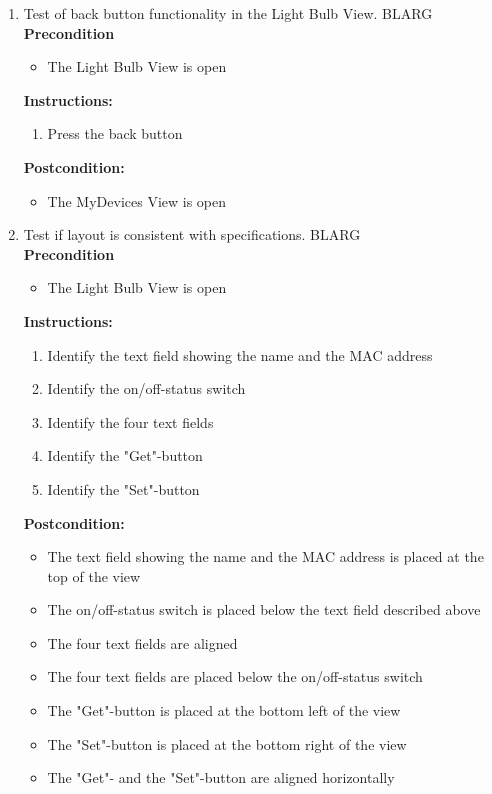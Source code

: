\documentclass[a4paper]{article}
\newlength{\testlabellength}
\newenvironment{testlist}{\begin{enumerate}[label=\bfseries Instruction \thesubsection.\arabic* , labelindent=0pt, labelwidth=\testlabellength , leftmargin=2cm]}{\end{enumerate}}
\newenvironment{precondition}{
{\color{white}BLARG}\\ 
\textbf{Precondition}
\begin{itemize}[labelindent=0cm, labelwidth=2cm , leftmargin=1cm]
}
{\end{itemize}}
\newenvironment{instruction}{
\textbf{Instructions:}
\begin{enumerate}[label=\bfseries  \arabic*., labelindent=0cm, labelwidth=2cm , leftmargin=1cm]
}
{\end{enumerate}}
\newenvironment{postcondition}{
\textbf{Postcondition:}
\begin{itemize}[labelindent=0cm, labelwidth=2cm , leftmargin=1cm]
}
{\end{itemize}}
\begin{document}
\begin{appendices}
\begin{testlist}
	\item Test of back button functionality in the Light Bulb View.
		\begin{precondition}
			\item The Light Bulb View is open
		\end{precondition}
		\begin{instruction}
			\item Press the back button
		\end{instruction}
		\begin{postcondition}
			\item The MyDevices View is open
		\end{postcondition}
    
	\item Test if layout is consistent with specifications.
		\begin{precondition}
			\item The Light Bulb View is open
		\end{precondition}
		\begin{instruction}
			\item Identify the text field showing the name and the MAC address
			\item Identify the on/off-status switch
			\item Identify the four text fields
			\item Identify the "Get"-button
			\item Identify the "Set"-button
		\end{instruction}
		\begin{postcondition}
			\item The text field showing the name and the MAC address is placed at the top of the view
			\item The on/off-status switch is placed below the text field described above
			\item The four text fields are aligned
			\item The four text fields are placed below the on/off-status switch
			\item The "Get"-button is placed at the bottom left of the view
			\item The "Set"-button is placed at the bottom right of the view
			\item The "Get"- and the "Set"-button are aligned horizontally
		\end{postcondition}


\end{testlist}
\end{appendices}
\end{document}
